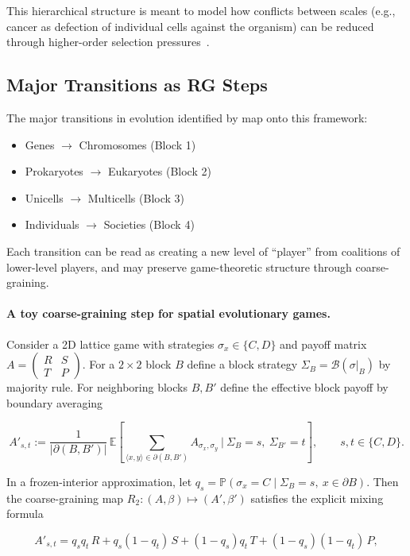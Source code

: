 \documentclass[12pt,a4paper]{article}
\theoremstyle{remark}
\begin{document}
This hierarchical structure is meant to model how conflicts between scales (e.g., cancer as defection of individual cells against the organism) can be reduced through higher-order selection pressures~\citep{ReplicatorOptimization}.

\subsection{Major Transitions as RG Steps}

The major transitions in evolution identified by \citet{SzathmaryMaynardSmith1995} map onto this framework:

\begin{itemize}
    \item Genes $\to$ Chromosomes (Block 1)
    \item Prokaryotes $\to$ Eukaryotes (Block 2)
    \item Unicells $\to$ Multicells (Block 3)
    \item Individuals $\to$ Societies (Block 4)
\end{itemize}

Each transition can be read as creating a new level of ``player'' from coalitions of lower-level players, and may preserve game-theoretic structure through coarse-graining.

\paragraph{A toy coarse-graining step for spatial evolutionary games.}
Consider a 2D lattice game with strategies $\sigma_x\in\{C,D\}$ and payoff matrix
$A=\begin{pmatrix}R&S\\ T&P\end{pmatrix}$.
For a $2\times 2$ block $B$ define a block strategy $\Sigma_B=\mathcal B(\sigma|_B)$ by majority rule.
For neighboring blocks $B,B'$ define the effective block payoff by boundary averaging

\[
A'_{s,t}
:=\frac{1}{|\partial(B,B')|}\,
\mathbb E\!\left[\sum_{\langle x,y\rangle\in\partial(B,B')} A_{\sigma_x,\sigma_y}\ \Big|\ \Sigma_B=s,\ \Sigma_{B'}=t\right],
\qquad s,t\in\{C,D\}.
\]

In a frozen-interior approximation, let
$q_s=\mathbb P(\sigma_x=C\mid \Sigma_B=s,\ x\in\partial B)$.
Then the coarse-graining map $R_2:(A,\beta)\mapsto(A',\beta')$ satisfies the explicit mixing formula

\[
A'_{s,t}
= q_s q_t\,R + q_s(1-q_t)\,S + (1-q_s)q_t\,T + (1-q_s)(1-q_t)\,P,
\]
\end{document}
